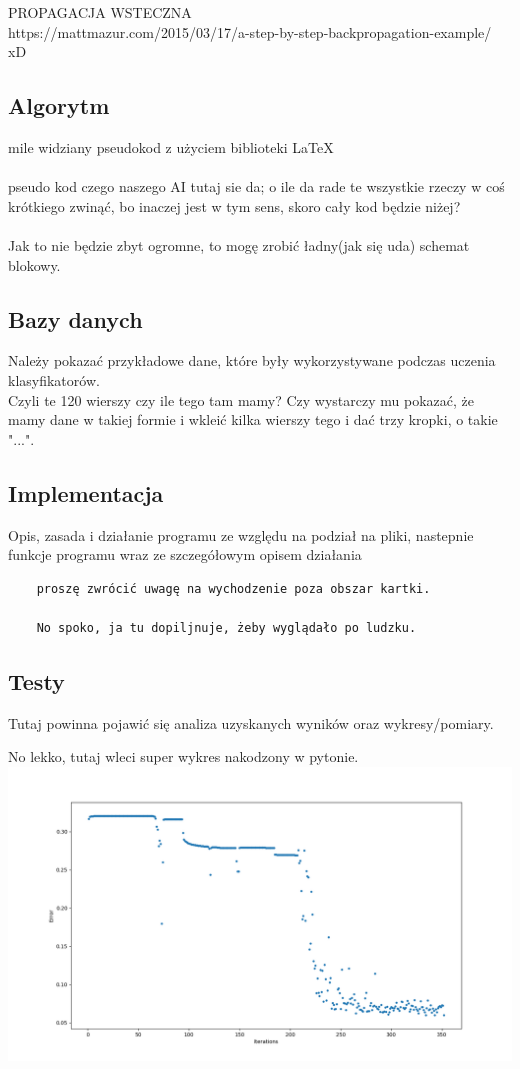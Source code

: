 \documentclass[12pt,a4paper]{article}
\begin{document}
	PROPAGACJA WSTECZNA \\
	https://mattmazur.com/2015/03/17/a-step-by-step-backpropagation-example/ \\
	xD\\
	\subsection*{Algorytm}
	mile widziany pseudokod z użyciem biblioteki \LaTeX
	\\
	\\
	pseudo kod czego naszego AI tutaj sie da; o ile da rade te wszystkie rzeczy w coś krótkiego zwinąć, bo inaczej jest w tym sens, skoro cały kod będzie niżej?\\
	\\
	Jak to nie będzie zbyt ogromne, to mogę zrobić ładny(jak się uda) schemat blokowy.
	\subsection*{Bazy danych}
	Należy pokazać przykładowe dane, które były wykorzystywane podczas uczenia klasyfikatorów.
	\\
	Czyli te 120 wierszy czy ile tego tam mamy? Czy wystarczy mu pokazać, że mamy dane w takiej formie i wkleić kilka wierszy tego i dać trzy kropki, o takie "...".
	\subsection*{Implementacja}
	Opis, zasada i działanie programu ze względu na podział na pliki, nastepnie	funkcje programu wraz ze szczegółowym opisem działania
	\begin{verbatim}
	proszę zwrócić uwagę na wychodzenie poza obszar kartki.
	
	No spoko, ja tu dopiljnuje, żeby wyglądało po ludzku.
	\end{verbatim}
	\subsection*{Testy}
	Tutaj powinna pojawić się analiza uzyskanych wyników oraz wykresy/pomiary.
	
	No lekko, tutaj wleci super wykres nakodzony w pytonie. \\
	\includegraphics[scale=0.5]{supa_wykres}
	\newpage
\end{document}

